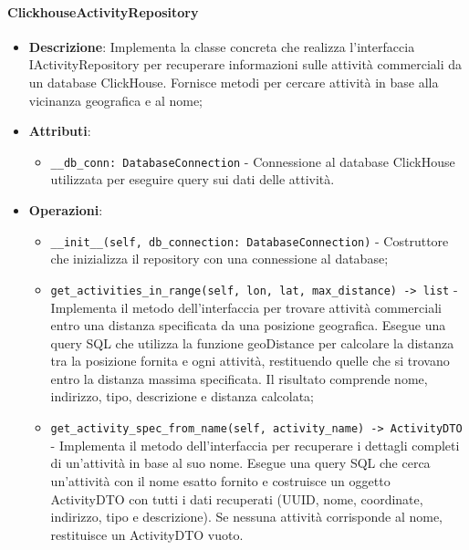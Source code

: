 \documentclass[10pt]{article}
\begin{document}
    \paragraph{ClickhouseActivityRepository}
    \begin{itemize} 
    \item \textbf{Descrizione}: Implementa la classe concreta che realizza l'interfaccia IActivityRepository per recuperare informazioni sulle attività commerciali da un database ClickHouse. Fornisce metodi per cercare attività in base alla vicinanza geografica e al nome;
    \item \textbf{Attributi}:
    \begin{itemize}
        \item \texttt{\_\_db\_conn: DatabaseConnection} - Connessione al database ClickHouse utilizzata per eseguire query sui dati delle attività.
    \end{itemize}
    
    \item \textbf{Operazioni}:
    \begin{itemize}
        \item \texttt{\_\_init\_\_(self, db\_connection: DatabaseConnection)} - Costruttore che inizializza il repository con una connessione al database;
        
        \item \texttt{get\_activities\_in\_range(self, lon, lat, max\_distance) -> list} - Implementa il metodo dell'interfaccia per trovare attività commerciali entro una distanza specificata da una posizione geografica. Esegue una query SQL che utilizza la funzione geoDistance per calcolare la distanza tra la posizione fornita e ogni attività, restituendo quelle che si trovano entro la distanza massima specificata. Il risultato comprende nome, indirizzo, tipo, descrizione e distanza calcolata;
        
        \item \texttt{get\_activity\_spec\_from\_name(self, activity\_name) -> ActivityDTO} - Implementa il metodo dell'interfaccia per recuperare i dettagli completi di un'attività in base al suo nome. Esegue una query SQL che cerca un'attività con il nome esatto fornito e costruisce un oggetto ActivityDTO con tutti i dati recuperati (UUID, nome, coordinate, indirizzo, tipo e descrizione). Se nessuna attività corrisponde al nome, restituisce un ActivityDTO vuoto.
    \end{itemize}
    \end{itemize}
    
\end{document}
